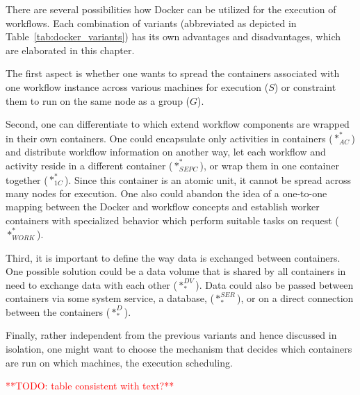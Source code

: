 
There are several possibilities how Docker can be utilized for the execution of workflows.
Each combination of variants (abbreviated as depicted in Table~\ref{tab:docker_variants}) has its own advantages and disadvantages, which are elaborated in this chapter.

The first aspect is whether one wants to spread the containers associated with one workflow instance across various machines for execution ($S$) or constraint them to run on the same node as a group ($G$).

Second, one can differentiate to which extend workflow components are wrapped in their own containers.
One could encapsulate only activities in containers ($*_{AC}^{*}$) and distribute workflow information on another way, let each workflow and activity reside in a different container ($*_{SEPC}^{*}$), or wrap them in one container together ($*_{1C}^{*}$). Since this container is an atomic unit, it cannot be spread across many nodes for execution. One also could abandon the idea of a one-to-one mapping between the Docker and workflow concepts and establish worker containers with specialized behavior which perform suitable tasks on request ($*_{WORK}^{*}$).

Third, it is important to define the way data is exchanged between containers. One possible solution could be a data volume that is shared by all containers in need to exchange data with each other ($*_{*}^{DV}$). Data could also be passed between containers via some system service, \eg a database, ($*_{*}^{SER}$), or on a direct connection between the containers ($*_{*}^{D}$).

Finally, rather independent from the previous variants and hence discussed in isolation, one might want to choose the mechanism that decides which containers are run on which machines, \ie the execution scheduling.

\textcolor{red}{**TODO: table consistent with text?**}

